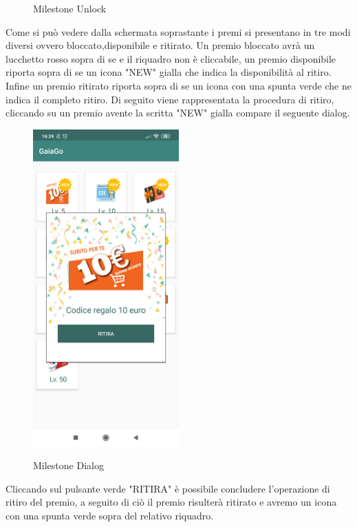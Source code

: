 \begin{itemize}
\begin{figure}[H]
	 	\caption{Milestone Unlock}
	 	\label{mile1}
	 \end{figure}
	 \pagebreak
	 Come si può vedere dalla schermata soprastante i premi si presentano in tre modi diversi ovvero bloccato,disponibile e ritirato.
	 Un premio bloccato avrà un lucchetto rosso sopra di se e il riquadro non è cliccabile, un premio disponibile riporta sopra di se un icona "NEW" gialla che indica la disponibilità al ritiro. Infine un premio ritirato riporta sopra di se un icona con una spunta verde che ne indica il completo ritiro.
	 Di seguito viene rappresentata la procedura di ritiro, cliccando su un premio avente la scritta "NEW" gialla compare il seguente dialog\glo.
	  \begin{figure}[H] 
	 	\centering 
	 	\includegraphics[width=0.5\textwidth]{res/images/milestone2.png}\\
	 	\caption{Milestone Dialog}
	 	\label{mile2}
	 \end{figure}
	 \pagebreak
	 Cliccando sul pulsante verde "RITIRA" è possibile concludere l'operazione di ritiro del premio, a seguito di ciò il premio risulterà ritirato e avremo un icona con una spunta verde sopra del relativo riquadro.
	  \begin{figure}[H] 
	 	\centering 

\end{figure}
\end{itemize}
